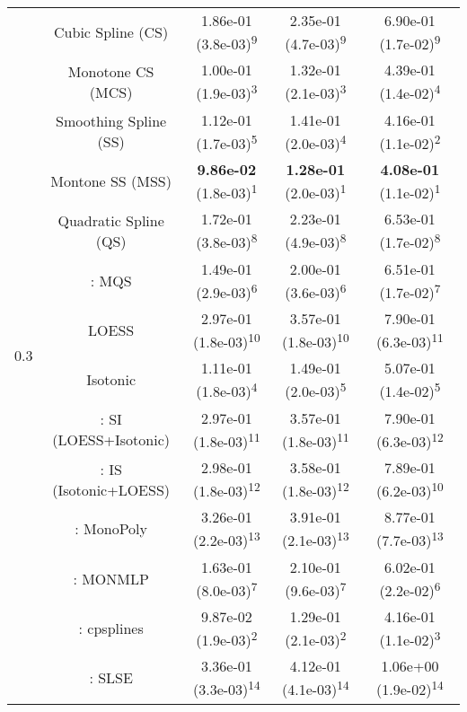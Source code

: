 \begin{tabular}{ccccc}
\midrule
\multirow{14}{*}{0.3}&Cubic Spline (CS)& 1.86e-01 (3.8e-03)\textsuperscript{9}& 2.35e-01 (4.7e-03)\textsuperscript{9}& 6.90e-01 (1.7e-02)\textsuperscript{9}\tabularnewline
&Monotone CS (MCS)& 1.00e-01 (1.9e-03)\textsuperscript{3}& 1.32e-01 (2.1e-03)\textsuperscript{3}& 4.39e-01 (1.4e-02)\textsuperscript{4}\tabularnewline
&Smoothing Spline (SS)& 1.12e-01 (1.7e-03)\textsuperscript{5}& 1.41e-01 (2.0e-03)\textsuperscript{4}& 4.16e-01 (1.1e-02)\textsuperscript{2}\tabularnewline
&Montone SS (MSS)& \textbf{9.86e-02} (1.8e-03)\textsuperscript{1}& \textbf{1.28e-01} (2.0e-03)\textsuperscript{1}& \textbf{4.08e-01} (1.1e-02)\textsuperscript{1}\tabularnewline
&Quadratic Spline (QS)& 1.72e-01 (3.8e-03)\textsuperscript{8}& 2.23e-01 (4.9e-03)\textsuperscript{8}& 6.53e-01 (1.7e-02)\textsuperscript{8}\tabularnewline
&\textcite{heMonotoneBsplineSmoothing1998}: MQS& 1.49e-01 (2.9e-03)\textsuperscript{6}& 2.00e-01 (3.6e-03)\textsuperscript{6}& 6.51e-01 (1.7e-02)\textsuperscript{7}\tabularnewline
&LOESS& 2.97e-01 (1.8e-03)\textsuperscript{10}& 3.57e-01 (1.8e-03)\textsuperscript{10}& 7.90e-01 (6.3e-03)\textsuperscript{11}\tabularnewline
&Isotonic& 1.11e-01 (1.8e-03)\textsuperscript{4}& 1.49e-01 (2.0e-03)\textsuperscript{5}& 5.07e-01 (1.4e-02)\textsuperscript{5}\tabularnewline
&\textcite{mammenEstimatingSmoothMonotone1991}: SI (LOESS+Isotonic)& 2.97e-01 (1.8e-03)\textsuperscript{11}& 3.57e-01 (1.8e-03)\textsuperscript{11}& 7.90e-01 (6.3e-03)\textsuperscript{12}\tabularnewline
&\textcite{mammenEstimatingSmoothMonotone1991}: IS (Isotonic+LOESS)& 2.98e-01 (1.8e-03)\textsuperscript{12}& 3.58e-01 (1.8e-03)\textsuperscript{12}& 7.89e-01 (6.2e-03)\textsuperscript{10}\tabularnewline
&\textcite{murrayFastFlexibleMethods2016a}: MonoPoly& 3.26e-01 (2.2e-03)\textsuperscript{13}& 3.91e-01 (2.1e-03)\textsuperscript{13}& 8.77e-01 (7.7e-03)\textsuperscript{13}\tabularnewline
&\textcite{cannonMonmlpMultilayerPerceptron2017}: MONMLP& 1.63e-01 (8.0e-03)\textsuperscript{7}& 2.10e-01 (9.6e-03)\textsuperscript{7}& 6.02e-01 (2.2e-02)\textsuperscript{6}\tabularnewline
&\textcite{navarro-garciaConstrainedSmoothingOutofrange2023}: cpsplines& 9.87e-02 (1.9e-03)\textsuperscript{2}& 1.29e-01 (2.1e-03)\textsuperscript{2}& 4.16e-01 (1.1e-02)\textsuperscript{3}\tabularnewline
&\textcite{groeneboomConfidenceIntervalsMonotone2023}: SLSE& 3.36e-01 (3.3e-03)\textsuperscript{14}& 4.12e-01 (4.1e-03)\textsuperscript{14}& 1.06e+00 (1.9e-02)\textsuperscript{14}\tabularnewline
\bottomrule
\end{tabular}
